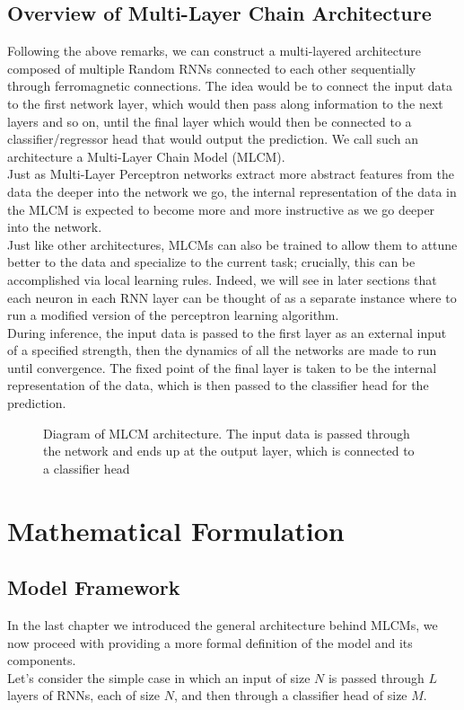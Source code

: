 \documentclass[a4paper,12pt]{report}
\begin{document}
\section{Overview of Multi-Layer Chain Architecture}
Following the above remarks, we can construct a multi-layered architecture composed of 
multiple Random RNNs connected to each other sequentially through ferromagnetic 
connections. The idea would be to connect the input data to the first network layer, 
which would then pass along information to the next layers and so on, until the final 
layer which would then be connected to a classifier/regressor head that would output 
the prediction. We call such an architecture a Multi-Layer Chain Model (MLCM).\\
Just as Multi-Layer Perceptron networks extract more abstract features from the data 
the deeper into the network we go, the internal representation of the data in the 
MLCM is expected to become more and more instructive as we go deeper into the network.\\
Just like other architectures, MLCMs can also be trained to allow them to attune 
better to the data and specialize to the current task; crucially, this can be 
accomplished via local learning rules. Indeed, we will see in later sections that 
each neuron in each RNN layer can be thought of as a separate instance where to run 
a modified version of the perceptron learning algorithm. \\
During inference, the input data is passed to the first layer as an external input of 
a specified strength, then the dynamics of all the networks are made to run until 
convergence. The fixed point of the final layer is taken to be the internal 
representation of the data, which is then passed to the classifier head for the prediction.

\begin{figure}[h!] 
    \centering
    \caption{Diagram of MLCM architecture. The input data is passed through the network and ends up
    at the output layer, which is connected to a classifier head}
    \label{fig: MLCM}
\end{figure}

\chapter{Mathematical Formulation}

\section{Model Framework}
In the last chapter we introduced the general architecture behind MLCMs, we now 
proceed with providing a more formal definition of the model and its components. \\
Let's consider the simple case in which an input of size $N$ is passed through $L$ layers
of RNNs, each of size $N$, and then through a classifier head of size $M$.
\vspace{0.5em}
\end{document}
